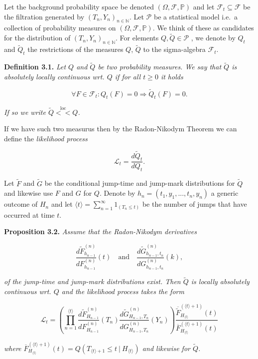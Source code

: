 \documentclass[a4paper,10pt,openany]{book}
\begin{document}
Let the background probability space be denoted \((\Omega,\mathcal F,\mathbb P)\) and let \(\mathcal F_t \subseteq \mathcal F\) be the filtration generated by \((T_n, Y_n)_{n\in \mathbb N}\). Let \(\mathcal P\) be a statistical model i.e.~a collection of probability measures on \((\Omega,\mathcal F,\mathbb P)\). We think of these as candidates for the distribution of \((T_n, Y_n)_{n\in \mathbb N}\). For elements \(Q, \tilde Q \in\mathcal P\) , we denote by \(Q_t\) and \(\tilde Q_t\) the restrictions of the measures \(Q\), \(\tilde Q\) to the sigma-algebra \(\mathcal F_t\).

\textbf{Definition 3.1.} \emph{Let \(Q\) and \(\tilde Q\) be two probability measures. We say that \(\tilde Q\) is absolutely locally continuous wrt. \(Q\) if for all \(t\ge 0\) it holds}

\[
\forall F\in\mathcal F_t: Q_t(F)=0\Rightarrow\tilde Q_t(F)=0.
\]

\emph{If so we write \(\tilde Q\stackrel{\text{loc}}{<<}Q\).}

If we have such two measurus then by the Radon-Nikodym Theorem we can define the \emph{likelihood process}

\[
\mathcal L_t=\frac{d \tilde Q_t}{d Q_t}.
\]

Let \(\tilde F\) and \(\tilde G\) be the conditional jump-time and jump-mark distributions for \(\tilde Q\) and likewise use \(F\) and \(G\) for \(Q\). Denote by \(h_n = (t_1, y_1, ..., t_n, y_n)\) a generic outcome of \(H_n\) and let \(\langle t\rangle = \sum_{n=1}^\infty 1_{(T_n\le t)}\) be the number of jumps that have occurred at time \(t\).

\textbf{Proposition 3.2.} \emph{Assume that the Radon-Nikodym derivatives}

\[
\frac{d\tilde F^{(n)}_{h_{n-1}}}{dF^{(n)}_{h_{n-1}}}(t)\quad \text{and}\quad \frac{d\tilde G^{(n)}_{h_{n-1},t_n}}{dG^{(n)}_{h_{n-1},t_n}}(k),
\]

\emph{of the jump-time and jump-mark distributions exist. Then \(\tilde Q\) is locally absolutely continuous wrt. \(Q\) and the likelihood process takes the form}

\[
\mathcal L_t=\left(\prod_{n=1}^{\langle t\rangle} \frac{d\tilde F^{(n)}_{H_{n-1}}}{dF^{(n)}_{H_{n-1}}}(T_n) \frac{d\tilde G^{(n)}_{H_{n-1},T_n}}{dG^{(n)}_{H_{n-1},T_n}}(Y_n)\right)\frac{{\overline {\tilde F}}^{(\langle t\rangle +1)}_{H_{\langle t\rangle}}(t)}{{\overline F}^{(\langle t\rangle +1)}_{H_{\langle t\rangle}}(t)}
\]

\emph{where \({\overline F}^{(\langle t\rangle +1)}_{H_{\langle t\rangle}}(t)=Q(T_{\langle t\rangle +1}\le t\ \vert\ H_{\langle t\rangle})\) and likewise for \(\tilde Q\).}
\end{document}
